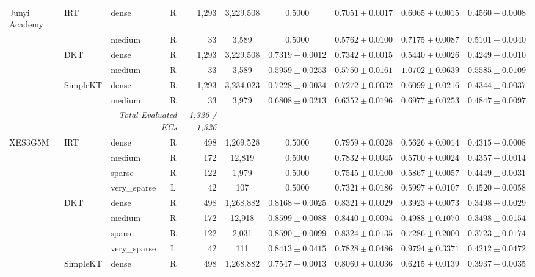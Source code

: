 \begin{tableorg}[htbp]
{\begin{tabular}{lllcrccccc}
\midrule
Junyi Academy & IRT & dense & R & 1,293 & 3,229,508 & $0.5000$ & $0.7051 \pm 0.0017$ & $0.6065 \pm 0.0015$ & $0.4560 \pm 0.0008$ \\
 &  & medium & R & 33 & 3,589 & $0.5000$ & $0.5762 \pm 0.0100$ & $0.7175 \pm 0.0087$ & $0.5101 \pm 0.0040$ \\
 & DKT & dense & R & 1,293 & 3,229,508 & $0.7319 \pm 0.0012$ & $0.7342 \pm 0.0015$ & $0.5440 \pm 0.0026$ & $0.4249 \pm 0.0010$ \\
 &  & medium & R & 33 & 3,589 & $0.5959 \pm 0.0253$ & $0.5750 \pm 0.0161$ & $1.0702 \pm 0.0639$ & $0.5585 \pm 0.0109$ \\
 & SimpleKT & dense & R & 1,293 & 3,234,023 & $0.7228 \pm 0.0034$ & $0.7272 \pm 0.0032$ & $0.6099 \pm 0.0216$ & $0.4344 \pm 0.0037$ \\
 &  & medium & R & 33 & 3,979 & $0.6808 \pm 0.0213$ & $0.6352 \pm 0.0196$ & $0.6977 \pm 0.0253$ & $0.4847 \pm 0.0097$ \\
\cmidrule{3-10}
 & & \multicolumn{2}{r}{\textit{Total Evaluated KCs}} & \textit{1,326 / 1,326} & \multicolumn{5}{l}{} \\
\midrule
XES3G5M & IRT & dense & R & 498 & 1,269,528 & $0.5000$ & $0.7959 \pm 0.0028$ & $0.5626 \pm 0.0014$ & $0.4315 \pm 0.0008$ \\
 &  & medium & R & 172 & 12,819 & $0.5000$ & $0.7832 \pm 0.0045$ & $0.5700 \pm 0.0024$ & $0.4357 \pm 0.0014$ \\
 &  & sparse & R & 122 & 1,979 & $0.5000$ & $0.7545 \pm 0.0100$ & $0.5867 \pm 0.0057$ & $0.4449 \pm 0.0031$ \\
 &  & very\_sparse & L & 42 & 107 & $0.5000$ & $0.7321 \pm 0.0186$ & $0.5997 \pm 0.0107$ & $0.4520 \pm 0.0058$ \\
 & DKT & dense & R & 498 & 1,268,882 & $0.8168 \pm 0.0025$ & $0.8321 \pm 0.0029$ & $0.3923 \pm 0.0073$ & $0.3498 \pm 0.0029$ \\
 &  & medium & R & 172 & 12,918 & $0.8599 \pm 0.0088$ & $0.8440 \pm 0.0094$ & $0.4988 \pm 0.1070$ & $0.3498 \pm 0.0154$ \\
 &  & sparse & R & 122 & 2,031 & $0.8590 \pm 0.0099$ & $0.8324 \pm 0.0135$ & $0.7286 \pm 0.2000$ & $0.3723 \pm 0.0174$ \\
 &  & very\_sparse & L & 42 & 111 & $0.8413 \pm 0.0415$ & $0.7828 \pm 0.0486$ & $0.9794 \pm 0.3371$ & $0.4212 \pm 0.0472$ \\
 & SimpleKT & dense & R & 498 & 1,268,882 & $0.7547 \pm 0.0013$ & $0.8060 \pm 0.0036$ & $0.6215 \pm 0.0139$ & $0.3937 \pm 0.0035$ \\

\end{tabular}}
\end{tableorg}
